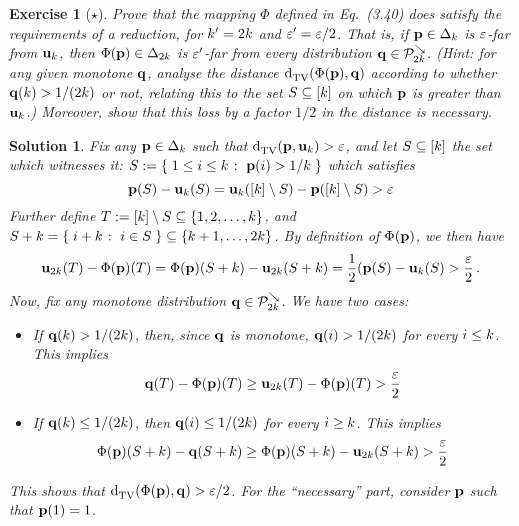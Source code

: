 \documentclass[biber,plain]{nowfnt} %
\newtheorem{question}{Exercise}[chapter]
\newtheorem{solution}{Solution}[chapter]
\begin{document}
\begin{question}[$\star$]\label{ex:reduction:monotone}
  Prove that the mapping $\Phi$ defined in Eq.~(3.40) does satisfy the requirements of a reduction, for $k'=2k$ and $\varepsilon'=\varepsilon/2$. That is, if $\mathbf{p}\in\Delta_{k}$ is $\varepsilon$-far from $\mathbf{u}_k$, then $\Phi(\mathbf{p})\in\Delta_{2k}$ is $\varepsilon'$-far from every distribution $\mathbf{q}\in\mathcal{P}^{\searrow}_{2k}$. \textit{(Hint: for any given monotone $\mathbf{q}$, analyse the distance $\totalvardist{\Phi(\p)}{\q}$ according to whether $\mathbf{q}(k) > 1/(2k)$ or not, relating this to the set $S\subseteq[k]$ on which $\mathbf{p}$ is greater than $\mathbf{u}_k$.)} Moreover, show that this loss by a factor $1/2$ in the distance is necessary.
\end{question}
\begin{solution}
Fix any $\mathbf{p}\in\Delta_{k}$ such that $\totalvardist{\p}{\uniform_\ab}>\dst$, and let $S\subseteq [k]$ the set which witnesses it:
$S\eqdef \setOfSuchThat{ 1\leq i\leq \ab }{\p(i)> 1/\ab }$ 
which satisfies 
\[
	\mathbf{p}(S)-\mathbf{u}_k(S) = \mathbf{u}_k([k]\setminus S)- \mathbf{p}([k]\setminus S) >\varepsilon
\]
Further define $T := [k]\setminus S \subseteq \{1,2,\dots,k\}$, and $S+\ab = \setOfSuchThat{i+\ab}{i\in S} \subseteq \{\ab+1,\dots,2\ab\}$. 
By definition of $\Phi(\mathbf{p})$, we then have
\[
	\mathbf{u}_{2k}(T)-\Phi(\mathbf{p})(T)=\Phi(\mathbf{p})(S+k)-\mathbf{u}_{2k}(S+k)= \frac{1}{2}(\mathbf{p}(S)-\mathbf{u}_k(S)>\frac{\varepsilon}{2}\,.
\]
Now, fix any monotone distribution $\mathbf{q}\in\mathcal{P}^{\searrow}_{2k}$. We have two cases:
\begin{itemize}
\item If $\mathbf{q}(k) > 1/(2k)$, then, since $\mathbf{q}$ is monotone, $\mathbf{q}(i) > 1/(2k)$ for every $i \leq k$. This implies
\[
	\mathbf{q}(T)-\Phi(\mathbf{p})(T) \geq \mathbf{u}_{2k}(T)-\Phi(\mathbf{p})(T) > \frac{\varepsilon}{2}
\]
\item If $\mathbf{q}(k) \leq 1/(2k)$, then $\mathbf{q}(i) \leq 1/(2k)$ for every $i \geq k$. This implies
\[
	\Phi(\mathbf{p})(S+k)-\mathbf{q}(S+k) \geq \Phi(\mathbf{p})(S+k)-\mathbf{u}_{2k}(S+k) > \frac{\varepsilon}{2}
\]
\end{itemize}
This shows that $\totalvardist{\Phi(\p)}{\q} > \dst/2$. For the ``necessary'' part, consider $\mathbf{p}$ such that $\mathbf{p}(1)=1$.
\end{solution}
\end{document}
